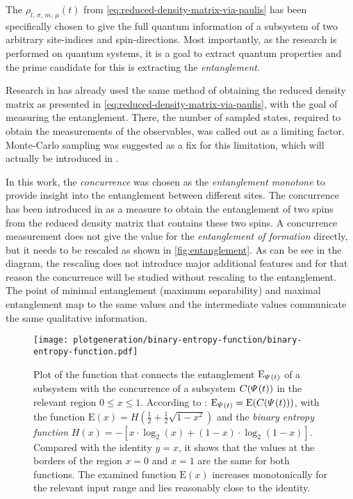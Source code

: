 The $\rho_{l,\,\sigma,\,m,\,\mu} (t)$ from \autoref{eq:reduced-density-matrix-via-paulis} has been specifically chosen to give the full quantum information of a subsystem of two arbitrary site-indices and spin-directions.
Most importantly, as the research is performed on quantum systems, it is a goal to extract quantum properties and the prime candidate for this is extracting the \emph{entanglement}.

Research in \cite{isingDynamicsWithClassicalNetworks} has already used the same method of obtaining the reduced density matrix as presented in \autoref{eq:reduced-density-matrix-via-paulis}, with the goal of measuring the entanglement.
There, the number of sampled states, required to obtain the measurements of the observables, was called out as a limiting factor.
Monte-Carlo sampling was suggested as a fix for this limitation, which will actually be introduced in .

In this work, the \emph{concurrence} was chosen as the \emph{entanglement monotone} to provide insight into the entanglement between different sites.
The concurrence has been introduced in \cite{concurrenceMainPaper} as a measure to obtain the entanglement of two spins from the reduced density matrix that contains these two spins.
A concurrence measurement does not give the value for the \emph{entanglement of formation} directly, but it needs to be rescaled as shown in \autoref{fig:entanglement}.
As can be see in the diagram, the rescaling does not introduce major additional features and for that reason the concurrence will be studied without rescaling to the entanglement.
The point of minimal entanglement (maximum separability) and maximal entanglement map to the same values and the intermediate values communicate the same qualitative information.

\begin{SCfigure}[2.0][htbp]
    \centering
    \texttt{[image: plotgeneration/binary-entropy-function/binary-entropy-function.pdf]}
    \caption{
        Plot of the function that connects the entanglement $\text{E}_{\varPsi^{}{}(t)}$ of a subsystem with the concurrence of a subsystem $C(\varPsi^{}{}(t))$ in the relevant region $0\leq x \leq 1$.
        According to \cite{concurrenceMainPaper}: $\text{E}_{\varPsi^{}{}(t)} = \text{E}(C(\varPsi^{}{}(t)))$, with the function $\text{E}(x) = H(\frac{1}{2} + \frac{1}{2} \sqrt{1-x^2})$ and the \emph{binary entropy function} $H(x) = -\left[x \cdot \log_2(x) + (1-x) \cdot \log_2(1-x)\right]$.
        Compared with the identity $y=x$, it shows that the values at the borders of the region $x=0$ and $x=1$ are the same for both functions. 
        The examined function $\text{E}(x)$ increases monotonically for the relevant input range and lies reasonably close to the identity. 
    }
    \label{fig:entanglement}
\end{SCfigure}

